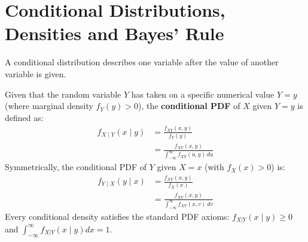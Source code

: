\documentclass[12pt,a4paper]{article}
\begin{document}
\section{Conditional Distributions, Densities and Bayes' Rule}

A conditional distribution describes one variable after the value of another variable is given.

\begin{tcolorbox}[defbox, title={\textbf{Definition: Conditional Probability Density Function}}]
Given that the random variable $Y$ has taken on a specific numerical value $Y = y$ (where marginal density $f_Y(y) > 0$), the \textbf{conditional PDF} of $X$ given $Y = y$ is defined as:
\begin{equation}
  \begin{aligned}
    f_{X \mid Y}(x \mid y) &= \frac{f_{XY}(x, y)}{f_Y(y)} \\[3pt]
    &= \frac{f_{XY}(x, y)}{\displaystyle\int_{-\infty}^\infty f_{XY}(u, y) \, du}
  \end{aligned}
\end{equation}
Symmetrically, the conditional PDF of $Y$ given $X = x$ (with $f_X(x) > 0$) is:
\begin{equation}
  \begin{aligned}
    f_{Y \mid X}(y \mid x) &= \frac{f_{XY}(x, y)}{f_X(x)} \\[3pt]
    &= \frac{f_{XY}(x, y)}{\displaystyle\int_{-\infty}^\infty f_{XY}(x, v) \, dv}
  \end{aligned}
\end{equation}
Every conditional density satisfies the standard PDF axioms: $f_{X|Y}(x \mid y) \ge 0$ and $\int_{-\infty}^\infty f_{X|Y}(x \mid y) dx = 1$.
\end{tcolorbox}
\end{document}
